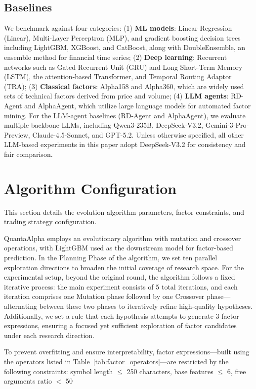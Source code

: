 \subsection{Baselines}
\label{appendix:A.5}

We benchmark against four categories: (1) \textbf{ML models}: Linear Regression (Linear), Multi-Layer Perceptron (MLP), and gradient boosting decision trees including LightGBM, XGBoost, and CatBoost, along with DoubleEnsemble, an ensemble method for financial time series; (2) \textbf{Deep learning}: Recurrent networks such as Gated Recurrent Unit (GRU) and Long Short-Term Memory (LSTM), the attention-based Transformer, and Temporal Routing Adaptor (TRA); (3) \textbf{Classical factors}: Alpha158 and Alpha360, which are widely used sets of technical factors derived from price and volume; (4) \textbf{LLM agents}: RD-Agent and AlphaAgent, which utilize large language models for automated factor mining. For the LLM-agent baselines (RD-Agent and AlphaAgent), we evaluate multiple backbone LLMs, including Qwen3-235B, DeepSeek-V3.2, Gemini-3-Pro-Preview, Claude-4.5-Sonnet, and GPT-5.2. Unless otherwise specified, all other LLM-based experiments in this paper adopt DeepSeek-V3.2 for consistency and fair comparison.

\section{Algorithm Configuration}
\label{sec:appendix_algorithm}


This section details the evolution algorithm parameters, factor constraints, and trading strategy configuration.

QuantaAlpha employs an evolutionary algorithm with mutation and crossover operations, with LightGBM used as the downstream model for factor-based prediction. In the Planning Phase of the algorithm, we set ten parallel exploration directions to broaden the initial coverage of research space. For the experimental setup, beyond the original round, the algorithm follows a fixed iterative process: the main experiment consists of 5 total iterations, and each iteration comprises one Mutation phase followed by one Crossover phase—alternating between these two phases to iteratively refine high-quality hypotheses. Additionally, we set a rule that each hypothesis attempts to generate 3 factor expressions, ensuring a focused yet sufficient exploration of factor candidates under each research direction.

To prevent overfitting and ensure interpretability, factor expressions—built using the operators listed in Table~\ref{tab:factor_operators}—are restricted by the following constraints: symbol length $\le$ 250 characters, base features $\le$ 6, free arguments ratio $<$ 50%

